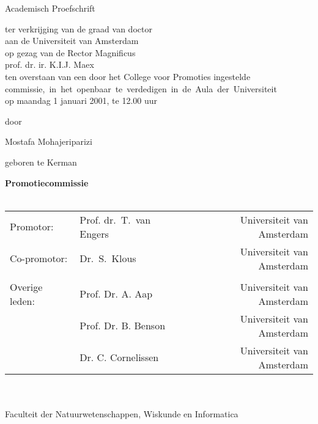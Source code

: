 {%
\clearpage
% 
 \par\vskip 2cm
 \begin{center}
 \printtitle
 \par\vspace {6cm}
 {\large \sc Academisch Proefschrift}
 \par\vspace {1cm}
 {\large ter verkrijging van de graad van doctor\\
 aan de Universiteit van Amsterdam\\
 op gezag van de Rector Magnificus\\
 prof. dr. ir. K.I.J. Maex\\                                 %
 ten overstaan van een door het College voor Promoties ingestelde\\
 \mbox{commissie, in het openbaar te verdedigen in de Aula der Universiteit}\\        %
 op maandag 1 januari 2001, te 12.00 uur \\ }        %
 \par\vspace {1cm} {\large door}
 \par \vspace {1cm} %
 {\Large Mostafa Mohajeriparizi}                        %
 \par\vspace {1cm} %
 {\large geboren te Kerman} %
 \end{center}
 \clearpage
 \noindent%
 {\bfseries Promotiecommissie}\\
 \\
 \begin{tabular}[t]{@{}llr}
 Promotor:      & Prof. dr.\ T.~van Engers  & Universiteit van Amsterdam \\  %
 Co-promotor:   & Dr.\ S.~Klous       & Universiteit van Amsterdam \\  %
 \\
 Overige leden: & Prof. Dr. A. Aap    & Universiteit van Amsterdam \\  %
                & Prof. Dr. B. Benson & Universiteit van Amsterdam \\  %
                & Dr. C. Cornelissen  & Universiteit van Amsterdam \\  %
 \end{tabular}\\
 \\
 Faculteit der Natuurwetenschappen, Wiskunde en Informatica\\ %

\clearpage
} %

